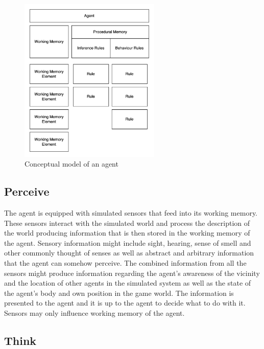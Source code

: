 \begin{figure}[h]
    \centering
    \includegraphics[width=0.6\textwidth]{images/chapter1/agent.drawio.png}
    \caption{Conceptual model of an agent}\label{fig:agent.drawio.png}
\end{figure}

\subsection{Perceive}

The agent is equipped with simulated sensors that feed into its working memory.
These sensors interact with the simulated world and process the description of the world producing information that is then stored in the working memory of the agent.
Sensory information might include sight, hearing, sense of smell and other commonly thought of senses as well as abstract and arbitrary information that the agent can somehow perceive.
The combined information from all the sensors might produce information regarding the agent's awareness of the vicinity and the location of other agents in the simulated system as well as the state of the agent's body and own position in the game world.
The information is presented to the agent and it is up to the agent to decide what to do with it.
Sensors may only influence working memory of the agent.

\subsection{Think}

